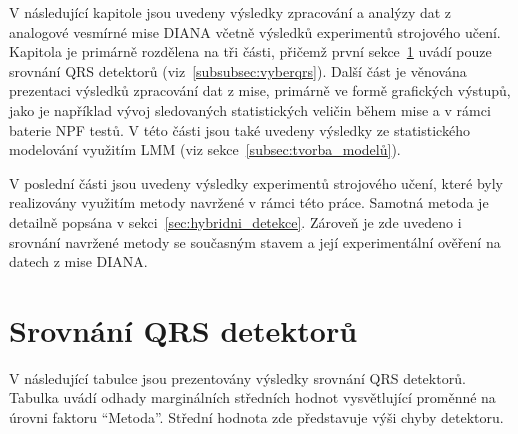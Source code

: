 V následující kapitole jsou uvedeny výsledky zpracování a analýzy dat z
analogové vesmírné mise DIANA včetně výsledků experimentů strojového učení.
Kapitola je primárně rozdělena na tři části, přičemž první
sekce~\ref{sec:vysledky_qrs} uvádí pouze srovnání QRS detektorů
(viz~\ref{subsubsec:vyberqrs}). Další část je věnována prezentaci výsledků
zpracování dat z mise, primárně ve formě grafických výstupů, jako je například
vývoj sledovaných statistických veličin během mise a v rámci baterie \gls{NPF}
testů. V této části jsou také uvedeny výsledky ze statistického modelování
využitím \gls{LMM} (viz sekce~\ref{subsec:tvorba_modelů}).

V poslední části jsou uvedeny výsledky experimentů strojového učení, které byly
realizovány využitím metody navržené v rámci této práce. Samotná metoda je
detailně popsána v sekci~\ref{sec:hybridni_detekce}. Zároveň je zde uvedeno i
srovnání navržené metody se současným stavem a její experimentální ověření na
datech z mise DIANA.

\section{Srovnání QRS detektorů}
\label{sec:vysledky_qrs}
V následující tabulce jsou prezentovány výsledky srovnání QRS detektorů. Tabulka
uvádí odhady marginálních středních hodnot vysvětlující proměnné na úrovni
faktoru \enquote{Metoda}. Střední hodnota zde představuje výši chyby detektoru.

